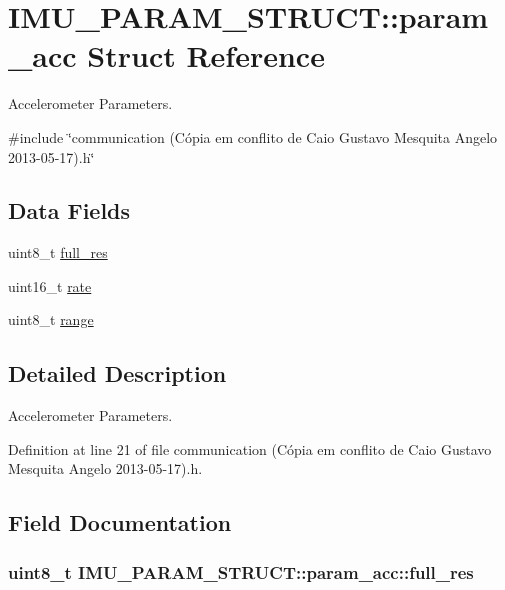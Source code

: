 \hypertarget{structIMU__PARAM__STRUCT_1_1param__acc}{\section{I\-M\-U\-\_\-\-P\-A\-R\-A\-M\-\_\-\-S\-T\-R\-U\-C\-T\-:\-:param\-\_\-acc Struct Reference}
\label{structIMU__PARAM__STRUCT_1_1param__acc}
}


Accelerometer Parameters.  




{\ttfamily \#include \char`\"{}communication (\-Cópia em conflito de Caio Gustavo Mesquita Angelo 2013-\/05-\/17).\-h\char`\"{}}

\subsection*{Data Fields}
\begin{DoxyCompactItemize}
\item 
uint8\-\_\-t \hyperlink{structIMU__PARAM__STRUCT_1_1param__acc_af57da5d956ffa7e49a184326b6b9c738}{full\-\_\-res}
\item 
uint16\-\_\-t \hyperlink{structIMU__PARAM__STRUCT_1_1param__acc_a30e6a318cad098cd8379416705820f95}{rate}
\item 
uint8\-\_\-t \hyperlink{structIMU__PARAM__STRUCT_1_1param__acc_a26199b298ef2d353192dfbc706bce8cf}{range}
\end{DoxyCompactItemize}


\subsection{Detailed Description}
Accelerometer Parameters. 

Definition at line 21 of file communication (\-Cópia em conflito de Caio Gustavo Mesquita Angelo 2013-\/05-\/17).\-h.



\subsection{Field Documentation}
\hypertarget{structIMU__PARAM__STRUCT_1_1param__acc_af57da5d956ffa7e49a184326b6b9c738}{
\subsubsection[{full\-\_\-res}]{\setlength{\rightskip}{0pt plus 5cm}uint8\-\_\-t I\-M\-U\-\_\-\-P\-A\-R\-A\-M\-\_\-\-S\-T\-R\-U\-C\-T\-::param\-\_\-acc\-::full\-\_\-res}}\label{structIMU__PARAM__STRUCT_1_1param__acc_af57da5d956ffa7e49a184326b6b9c738}



